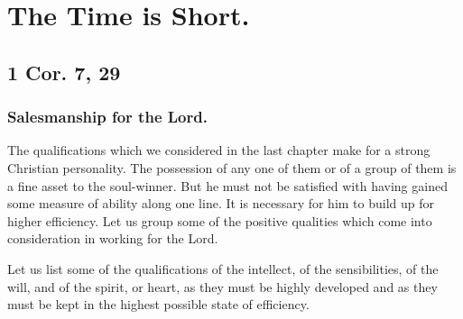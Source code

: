 \documentclass[
]{book}
\begin{document}
\chapter{The Time is Short.}\label{the-time-is-short.}

\section*{1 Cor. 7, 29}\label{cor.-7-29}

\subsection*{Salesmanship for the Lord.}\label{salesmanship-for-the-lord.}

The qualifications which we considered in the last chapter make for a strong Christian personality. The possession of any one of them or of a group of them is a fine asset to the soul-winner. But he must not be satisfied with having gained some measure of ability along one line. It is necessary for him to build up for higher efficiency. Let us group some of the positive qualities which come into consideration in working for the Lord.

Let us list some of the qualifications of the intellect, of the sensibilities, of the will, and of the spirit, or heart, as they must be highly developed and as they must be kept in the highest possible state of efficiency.
\end{document}
